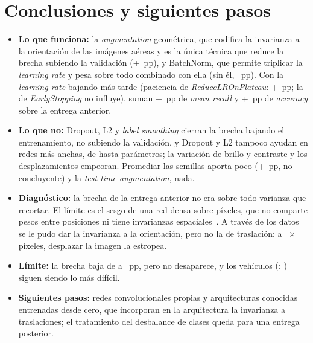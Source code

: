 \section{Conclusiones y siguientes pasos}
\begin{itemize}
  \item \textbf{Lo que funciona:} la \emph{augmentation} geométrica, que codifica la invarianza a la orientación de
  las imágenes aéreas y es la única técnica que reduce la brecha subiendo la validación (+~pp), y
  BatchNorm, que permite triplicar la \emph{learning rate} y pesa sobre todo combinado con ella (sin él,
  ~pp). Con la \emph{learning rate} bajando más tarde (paciencia de \emph{ReduceLROnPlateau}: +~pp; la de \emph{EarlyStopping} no influye), suman +~pp de \emph{mean recall} y
  +~pp de \emph{accuracy} sobre la entrega anterior.
  \item \textbf{Lo que no:} Dropout, L2 y \emph{label smoothing} cierran la brecha bajando el entrenamiento, no
  subiendo la validación, y Dropout y L2 tampoco ayudan en redes más anchas, de hasta  parámetros; la variación de brillo y contraste y
  los desplazamientos empeoran. Promediar las  semillas
  aporta poco (+~pp, no concluyente) y la \emph{test-time augmentation}, nada.
  \item \textbf{Diagnóstico:} la brecha de la entrega anterior no era sobre todo varianza que recortar. El límite es
  el sesgo de una red densa sobre píxeles, que no comparte pesos entre posiciones ni tiene invarianzas
  espaciales~\cite{goodfellow}. A través de los datos se le pudo dar la invarianza a la orientación, pero no la de
  traslación: a ~$\times$~ píxeles, desplazar la imagen la estropea.
  \item \textbf{Límite:} la brecha baja de  a ~pp, pero no desaparece, y los
  vehículos (: ) siguen siendo lo más difícil.
  \item \textbf{Siguientes pasos:} redes convolucionales propias y arquitecturas conocidas entrenadas desde cero, que
  incorporan en la arquitectura la invarianza a traslaciones; el tratamiento del desbalance de clases queda para una
  entrega posterior.
\end{itemize}

